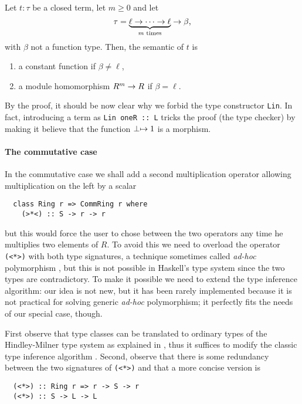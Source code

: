 \begin{proposition}
  Let $t:\tau$ be a closed term, let $m\ge0$ and let
  \begin{equation}
    \label{eq:264}
    \tau=\underbrace{\ell\rightarrow\cdots\rightarrow\ell}_{\text{$m$ times}}\rightarrow\beta
    \text{,}    
  \end{equation}
  with $\beta$ not a function type. Then, the semantic of $t$ is
  \begin{enumerate}
  \item\label{item:1} a constant function if $\beta\ne\ell$,
  \item\label{item:2} a module homomorphism $R^m\rightarrow R$ if $\beta=\ell$.
  \end{enumerate}
\end{proposition}

By the proof, it should be now clear why we forbid the type
constructor \lstinline{Lin}. In fact, introducing a term as
\lstinline{Lin oneR :: L} tricks the proof (the type checker) by
making it believe that the function $\perp\mapsto 1$ is a morphism.


\paragraph{The commutative case}
\label{sec:commutative-case}
In the commutative case we shall add a second multiplication operator
allowing multiplication on the left by a scalar
\begin{lstlisting}
  class Ring r => CommRing r where
    (>*<) :: S -> r -> r 
\end{lstlisting}
but this would force the user to chose between the two operators any
time he multiplies two elements of $R$. To avoid this we need to
overload the operator \lstinline{(<*>)} with both type signatures, a
technique sometimes called \emph{ad-hoc} polymorphism
\cite{strachey00}, but this is not possible in Haskell's type system
since the two types are contradictory.  To make it possible we need to
extend the type inference algorithm: our idea is not new, but it has
been rarely implemented because it is not practical for solving
generic \emph{ad-hoc} polymorphism; it perfectly fits the needs of our
special case, though.

First observe that type classes can be translated to ordinary types of
the Hindley-Milner type system as explained in \cite[$\S
4$]{Walder+Blott-ad-hoc-polymorphism}, thus it suffices to modify the
classic type inference algorithm
\cite{Damas+Milner,Cardelli:Typechecking}. Second, observe that there
is some redundancy between the two signatures of \lstinline{(<*>)} and
that a more concise version is
\begin{lstlisting}
  (<*>) :: Ring r => r -> S -> r
  (<*>) :: S -> L -> L
\end{lstlisting}

